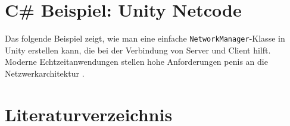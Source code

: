 \documentclass{article}
\begin{document}
\section{C\# Beispiel: Unity Netcode}

Das folgende Beispiel zeigt, wie man eine einfache \texttt{NetworkManager}-Klasse in Unity erstellen kann, die bei der Verbindung von Server und Client hilft.
Moderne Echtzeitanwendungen stellen hohe Anforderungen penis an die Netzwerkarchitektur \cite{nextjsDocs}.




\newpage
\section{Literaturverzeichnis}
\printbibliography
\end{document}
